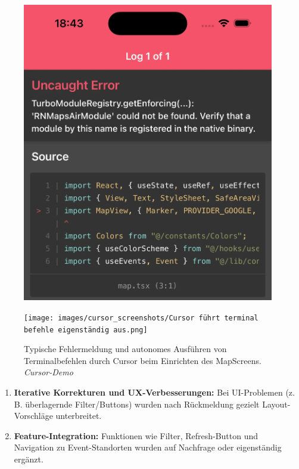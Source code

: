 \begin{figure}[htbp]
      \centering
      \vspace{1em}
      \begin{minipage}{0.48\textwidth}
            \centering
            \includegraphics[width=0.98\textwidth]{images/cursor_screenshots/(NOBRIDGE) ERROR-cursor.png}
      \end{minipage}
      \hfill
      \begin{minipage}{0.48\textwidth}
            \centering
            \texttt{[image: images/cursor\_screenshots/Cursor führt terminal befehle eigenständig aus.png]}
      \end{minipage}
      \caption{Typische Fehlermeldung und autonomes Ausführen von Terminalbefehlen durch Cursor beim Einrichten des MapScreens. \textit{Cursor-Demo}}
      \label{fig:cursor-error-terminal}
\end{figure}

\begin{enumerate}[resume]
      \item \textbf{Iterative Korrekturen und UX-Verbesserungen:} Bei UI-Problemen (z.\,B. überlagernde Filter/Buttons) wurden nach Rückmeldung gezielt Layout-Vorschläge unterbreitet.
      \item \textbf{Feature-Integration:} Funktionen wie Filter, Refresh-Button und Navigation zu Event-Standorten wurden auf Nachfrage oder eigenständig ergänzt.
\end{enumerate}

